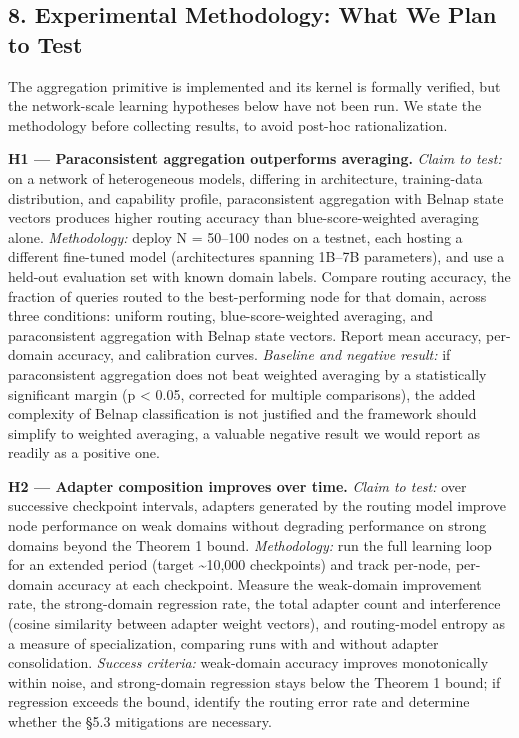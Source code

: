 \subsection{8. Experimental Methodology: What We Plan to
Test}\label{experimental-methodology-what-we-plan-to-test}

The aggregation primitive is implemented and its kernel is formally
verified, but the network-scale learning hypotheses below have not been
run. We state the methodology before collecting results, to avoid
post-hoc rationalization.

\textbf{H1 --- Paraconsistent aggregation outperforms averaging.}
\emph{Claim to test:} on a network of heterogeneous models, differing in
architecture, training-data distribution, and capability profile,
paraconsistent aggregation with Belnap state vectors produces higher
routing accuracy than blue-score-weighted averaging alone.
\emph{Methodology:} deploy N = 50--100 nodes on a testnet, each hosting
a different fine-tuned model (architectures spanning 1B--7B parameters),
and use a held-out evaluation set with known domain labels. Compare
routing accuracy, the fraction of queries routed to the best-performing
node for that domain, across three conditions: uniform routing,
blue-score-weighted averaging, and paraconsistent aggregation with
Belnap state vectors. Report mean accuracy, per-domain accuracy, and
calibration curves. \emph{Baseline and negative result:} if
paraconsistent aggregation does not beat weighted averaging by a
statistically significant margin (p \textless{} 0.05, corrected for
multiple comparisons), the added complexity of Belnap classification is
not justified and the framework should simplify to weighted averaging, a
valuable negative result we would report as readily as a positive one.

\textbf{H2 --- Adapter composition improves over time.} \emph{Claim to
test:} over successive checkpoint intervals, adapters generated by the
routing model improve node performance on weak domains without degrading
performance on strong domains beyond the Theorem 1 bound.
\emph{Methodology:} run the full learning loop for an extended period
(target \textasciitilde10,000 checkpoints) and track per-node,
per-domain accuracy at each checkpoint. Measure the weak-domain
improvement rate, the strong-domain regression rate, the total adapter
count and interference (cosine similarity between adapter weight
vectors), and routing-model entropy as a measure of specialization,
comparing runs with and without adapter consolidation. \emph{Success
criteria:} weak-domain accuracy improves monotonically within noise, and
strong-domain regression stays below the Theorem 1 bound; if regression
exceeds the bound, identify the routing error rate and determine whether
the §5.3 mitigations are necessary.

